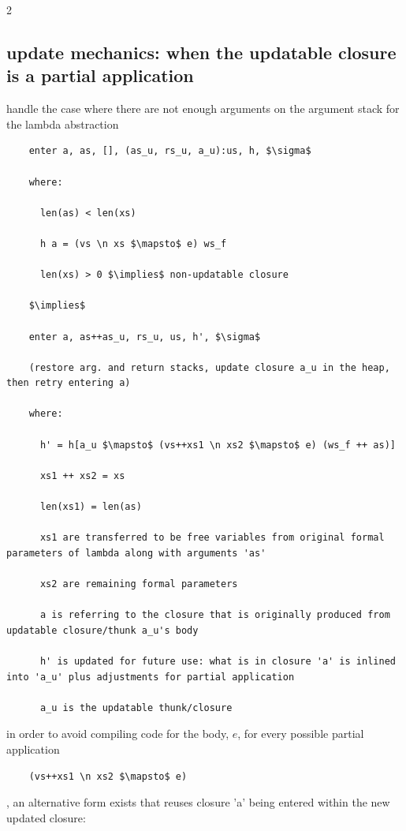 \documentclass[8pt]{extarticle}
\begin{document}
\begin{multicols*}{2}
  \vfill\null
  \columnbreak

  \subsection{update mechanics: when the updatable closure is a partial application}

  handle the case where there are not enough arguments on the argument stack for the lambda abstraction

  \begin{lstlisting}
    enter a, as, [], (as_u, rs_u, a_u):us, h, $\sigma$

    where:

      len(as) < len(xs)

      h a = (vs \n xs $\mapsto$ e) ws_f

      len(xs) > 0 $\implies$ non-updatable closure

    $\implies$

    enter a, as++as_u, rs_u, us, h', $\sigma$

    (restore arg. and return stacks, update closure a_u in the heap, then retry entering a)

    where:

      h' = h[a_u $\mapsto$ (vs++xs1 \n xs2 $\mapsto$ e) (ws_f ++ as)]

      xs1 ++ xs2 = xs

      len(xs1) = len(as)

      xs1 are transferred to be free variables from original formal parameters of lambda along with arguments 'as'

      xs2 are remaining formal parameters

      a is referring to the closure that is originally produced from updatable closure/thunk a_u's body

      h' is updated for future use: what is in closure 'a' is inlined into 'a_u' plus adjustments for partial application

      a_u is the updatable thunk/closure
  \end{lstlisting}

  \vfill\null
  \columnbreak

  in order to avoid compiling code for the body, $e$, for every possible partial application
  \begin{lstlisting}
    (vs++xs1 \n xs2 $\mapsto$ e)
  \end{lstlisting}
  , an alternative form exists that reuses closure 'a' being entered within the new updated closure:


\end{multicols*}
\end{document}
